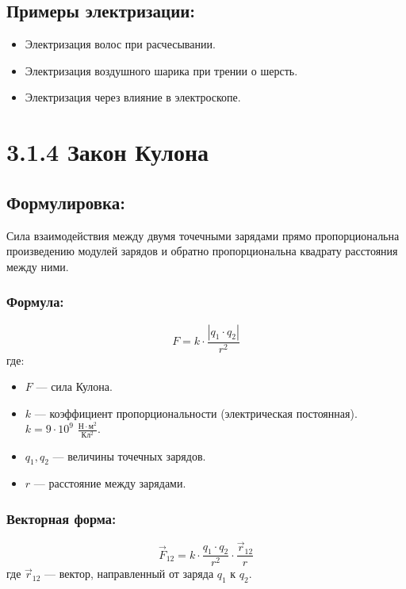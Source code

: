 \documentclass[a4paper,12pt]{article}
\begin{document}
\vspace{-9pt}
\subsection*{Примеры электризации:}
\vspace{-3pt}
\begin{itemize}
    \item Электризация волос при расчесывании.
    \item Электризация воздушного шарика при трении о шерсть.
    \item Электризация через влияние в электроскопе.
\end{itemize}

\newpage
\section*{3.1.4 Закон Кулона}

\vspace{-9pt}
\subsection*{Формулировка:}
\vspace{-3pt}
Сила взаимодействия между двумя точечными зарядами прямо пропорциональна произведению модулей зарядов и обратно пропорциональна квадрату расстояния между ними.

\vspace{-9pt}
\subsubsection*{Формула:}
\vspace{-3pt}
\vspace{-0.05em}
$$ F = k \cdot \frac{|q_1 \cdot q_2|}{r^2} $$
где:
\begin{itemize}
    \item $F$ — сила Кулона.
    \item $k$ — коэффициент пропорциональности (электрическая постоянная). $k = 9 \cdot 10^9$ $\frac{Н \cdot м^2}{Кл^2}$.
    \item $q_1, q_2$ — величины точечных зарядов.
    \item $r$ — расстояние между зарядами.
\end{itemize}


\vspace{-9pt}
\subsubsection*{Векторная форма:}
\vspace{-3pt}
$$ \vec{F}_{12} = k \cdot \frac{q_1 \cdot q_2}{r^2} \cdot \frac{\vec{r}_{12}}{r} $$
где $\vec{r}_{12}$ — вектор, направленный от заряда $q_1$ к $q_2$.
\end{document}
